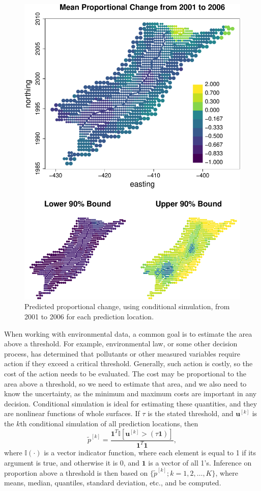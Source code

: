 \documentclass[12pt, titlepage]{article}
\begin{document}
\begin{figure}[H]
  \begin{center}
	    \includegraphics[width=0.8\linewidth]{figures/Moss_diffmaps}
  \end{center}
  \caption{Predicted proportional change, using conditional simulation, from 2001 to 2006 for each prediction location. \label{Fig:MossDiffMaps}}
\end{figure}

\newpage{}
When working with environmental data, a common goal is to estimate the area above a threshold.  For example, environmental law, or some other decision process, has determined that pollutants or other measured variables require action if they exceed a critical threshold.  Generally, such action is costly, so the cost of the action needs to be evaluated.  The cost may be proportional to the area above a threshold, so we need to estimate that area, and we also need to know the uncertainty, as the minimum and maximum costs are important in any decision.  Conditional simulation is ideal for estimating these quantities, and they are nonlinear functions of whole surfaces. If $\tau$ is the stated threshold, and $\mathbf{u}^{[k]}$ is the $k$th conditional simulation of all prediction locations, then
$$
\tilde{p}^{[k]} = \frac{\mathbf{1}^{T}\mathbb{I}[\mathbf{u}^{[k]} > (\tau\mathbf{1})]}{\mathbf{1}^{T}\mathbf{1}},
$$
where $\mathbb{I}(\cdot)$ is a vector indicator function, where each element is equal to 1 if its argument is true, and otherwise it is 0, and $\mathbf{1}$ is a vector of all 1's.  Inference on proportion above a threshold is then based on $\{\tilde{p}^{[k]};k = 1, 2, \ldots, K\}$, where means, median, quantiles, standard deviation, etc., and be computed.
\end{document}
